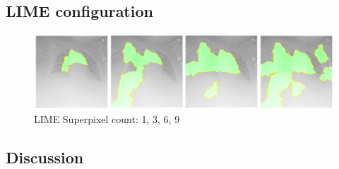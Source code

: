 \subsection{LIME configuration}

\begin{figure}[H]
\centering
\caption{LIME Superpixel count: 1, 3, 6, 9}
\includegraphics[width=14cm]{chapters/03_classification/images/lime-superpixel.png}
\end{figure}

\subsection{Discussion}
